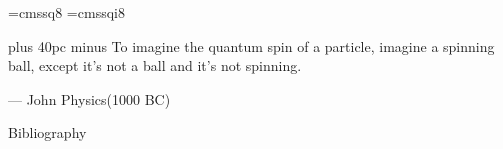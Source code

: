 \documentclass[aspectratio=169]{beamer}
\begin{document}

\font\eightss=cmssq8
\font\eightssi=cmssqi8
\newcommand\quoteAuthorDate[3]{\begingroup
  \baselineskip 10pt
  \parfillskip 0pt
  \interlinepenalty 10000 %
  \leftskip 0pt plus 40pc minus \parindent
  \let\rm=\eightss
  \let\sl=\eightssi
  \everypar{\sl}#1\par
  \nobreak\smallskip
  \noindent\rm--- #2\unskip\enspace(#3)\par
  \endgroup}
\begin{frame}
    \begin{center}
        \item \quoteAuthorDate{To imagine the quantum spin of a particle, imagine a spinning ball, except it's not a ball and it's not spinning.}{John Physics}{\textcolor{sigma@mainblue}{1000 BC}}
    \end{center}
\end{frame}

\begin{frame}{Bibliography}
    \nocite{wong2022introduction}
    
    
\end{frame}
\end{document}
